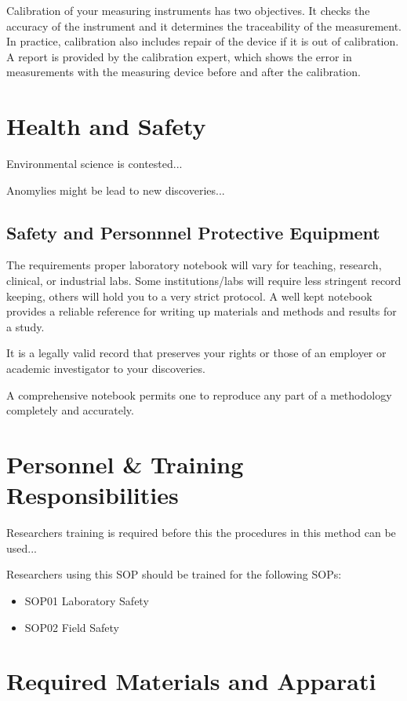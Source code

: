 \documentclass[12pt]{../SOP3_beta}
\begin{document}
\NP Calibration of your measuring instruments has two objectives. It checks the accuracy of the instrument and it determines the traceability of the measurement. In practice, calibration also includes repair of the device if it is out of calibration. A report is provided by the calibration expert, which shows the error in measurements with the measuring device before and after the calibration.

\section{Health and Safety}

\NP Environmental science is contested...

\NP Anomylies might be lead to new discoveries...


\subsection*{Safety and Personnnel Protective Equipment}

\NP The requirements proper laboratory notebook will vary for teaching, research, clinical, or industrial labs. Some institutions/labs will require less stringent record keeping, others will hold you to a very strict protocol. A well kept notebook provides a reliable reference for writing up materials and methods and results for a study. 

\NP It is a legally valid record that preserves your rights or those of an employer or academic investigator to your discoveries. 

\NP A comprehensive notebook permits one to reproduce any part of a methodology completely and accurately.


\section{Personnel \& Training Responsibilities}

\NP Researchers training is required before this the procedures in this method can be used... 

\NP Researchers using this SOP should be trained for the following SOPs:

\begin{itemize}
  \item SOP01 Laboratory Safety
  \item SOP02 Field Safety
\end{itemize}

\section{Required Materials and Apparati}
\end{document}
